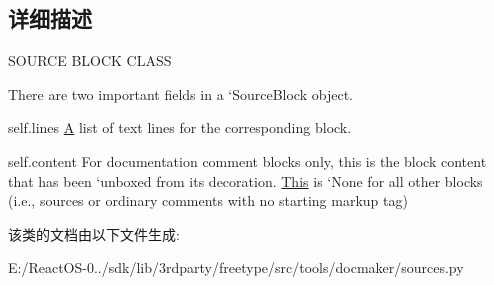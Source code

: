 \subsection{详细描述}
S\+O\+U\+R\+CE B\+L\+O\+CK C\+L\+A\+SS 

There are two important fields in a `\+Source\+Block\textquotesingle{} object.

self.\+lines \hyperlink{struct_a}{A} list of text lines for the corresponding block.

self.\+content For documentation comment blocks only, this is the block content that has been `unboxed\textquotesingle{} from its decoration. \hyperlink{namespace_this}{This} is `\+None\textquotesingle{} for all other blocks (i.\+e., sources or ordinary comments with no starting markup tag) 

该类的文档由以下文件生成\+:\begin{DoxyCompactItemize}
\item 
E\+:/\+React\+O\+S-\/0../sdk/lib/3rdparty/freetype/src/tools/docmaker/sources.\+py\end{DoxyCompactItemize}
